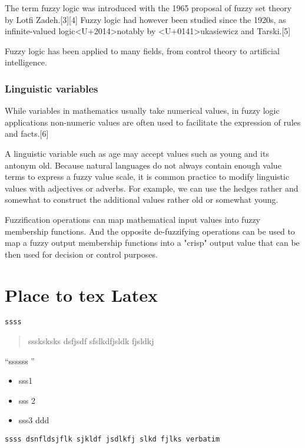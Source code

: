 \documentclass{report}
\begin{document}
The term fuzzy logic was introduced with the 1965 proposal of fuzzy set theory by Lotfi Zadeh.[3][4] Fuzzy logic had however been studied since the 1920s, as infinite-valued logic<U+2014>notably by <U+0141>ukasiewicz and Tarski.[5]

Fuzzy logic has been applied to many fields, from control theory to artificial intelligence.


\subsection*{Linguistic variables}

While variables in mathematics usually take numerical values, in fuzzy logic applications non-numeric values are often used to facilitate the expression of rules and facts.[6]

A linguistic variable such as age may accept values such as young and its antonym old. Because natural languages do not always contain enough value terms to express a fuzzy value scale, it is common practice to modify linguistic values with adjectives or adverbs. For example, we can use the hedges rather and somewhat to construct the additional values rather old or somewhat young.

Fuzzification operations can map mathematical input values into fuzzy membership functions. And the opposite de-fuzzifying operations can be used to map a fuzzy output membership functions into a "crisp" output value that can be then used for decision or control purposes.


\chapter{Place to tex Latex}

\texttt{ssss}

\begin{quote}
sssksksks dsfjsdf sfslkdfjsldk fjsldkj
\end{quote}


``ssssss ''

\begin{itemize}
  \item sss1
  \item sss 2
  \item sss3 ddd
\end{itemize}


\begin{verbatim}
ssss dsnfldsjflk sjkldf jsdlkfj slkd fjlks verbatim 
\end{verbatim}
\end{document}
